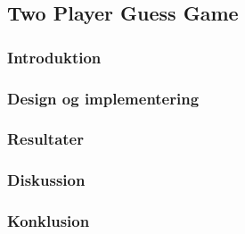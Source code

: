 \subsection{Two Player Guess Game}

\subsubsection{Introduktion}

\subsubsection{Design og implementering}
\subsubsection{Resultater}
\subsubsection{Diskussion}
\subsubsection{Konklusion}